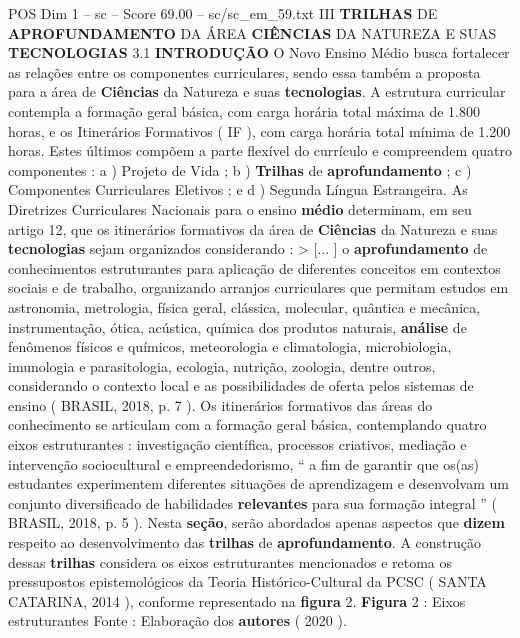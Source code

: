 \begin{textsample}{POS Dim 1 – sc – Score 69.00 – sc/sc\_em\_59.txt}  \label{ex:f1_pos_011}
III \textbf{TRILHAS} DE \textbf{APROFUNDAMENTO} DA ÁREA \textbf{CIÊNCIAS} DA NATUREZA E SUAS \textbf{TECNOLOGIAS} 3.1 \textbf{INTRODUÇÃO} O Novo Ensino Médio busca fortalecer as relações entre os componentes curriculares, sendo essa também a proposta para a área de \textbf{Ciências} da Natureza e suas \textbf{tecnologias}.
A estrutura curricular contempla a formação geral básica, com carga horária total máxima de 1.800 horas, e os Itinerários Formativos ( IF ), com carga horária total mínima de 1.200 horas.
Estes últimos compõem a parte flexível do currículo e compreendem quatro componentes : a ) Projeto de Vida ; b ) \textbf{Trilhas} de \textbf{aprofundamento} ; c ) Componentes Curriculares Eletivos ; e d ) Segunda Língua Estrangeira.
As Diretrizes Curriculares Nacionais para o ensino \textbf{médio} determinam, em seu artigo 12, que os itinerários formativos da área de \textbf{Ciências} da Natureza e suas \textbf{tecnologias} sejam organizados considerando : > [... ] o \textbf{aprofundamento} de conhecimentos estruturantes para aplicação de diferentes conceitos em contextos sociais e de trabalho, organizando arranjos curriculares que permitam estudos em astronomia, metrologia, física geral, clássica, molecular, quântica e mecânica, instrumentação, ótica, acústica, química dos produtos naturais, \textbf{análise} de fenômenos físicos e químicos, meteorologia e climatologia, microbiologia, imunologia e parasitologia, ecologia, nutrição, zoologia, dentre outros, considerando o contexto local e as possibilidades de oferta pelos sistemas de ensino ( BRASIL, 2018, p. 7 ).
Os itinerários formativos das áreas do conhecimento se articulam com a formação geral básica, contemplando quatro eixos estruturantes : investigação científica, processos criativos, mediação e intervenção sociocultural e empreendedorismo, “ a fim de garantir que os(as) estudantes experimentem diferentes situações de aprendizagem e desenvolvam um conjunto diversificado de habilidades \textbf{relevantes} para sua formação integral ” ( BRASIL, 2018, p. 5 ).
Nesta \textbf{seção}, serão abordados apenas aspectos que \textbf{dizem} respeito ao desenvolvimento das \textbf{trilhas} de \textbf{aprofundamento}.
A construção dessas \textbf{trilhas} considera os eixos estruturantes mencionados e retoma os pressupostos epistemológicos da Teoria Histórico-Cultural da PCSC ( SANTA CATARINA, 2014 ), conforme representado na \textbf{figura} 2. \textbf{Figura} 2 : Eixos estruturantes Fonte : Elaboração dos \textbf{autores} ( 2020 ).

\end{textsample}
